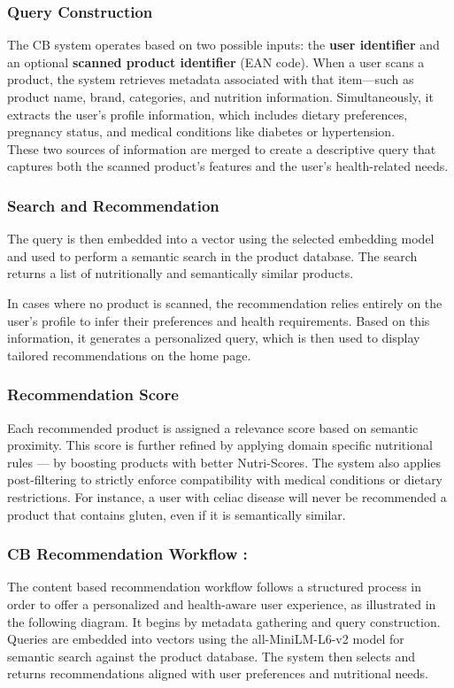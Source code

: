 \subsubsection{Query Construction}
\par The CB system operates based on two possible inputs: the \textbf{user identifier} and an optional \textbf{scanned product identifier} (EAN code). When a user scans a product, the system retrieves metadata associated with that item—such as product name, brand, categories, and nutrition information. Simultaneously, it extracts the user’s profile information, which includes dietary preferences, pregnancy status, and medical conditions like diabetes or hypertension.\\
These two sources of information are merged to create a descriptive query that captures both the scanned product’s features and the user's health-related needs. 

\subsubsection{Search and Recommendation}
The query is then embedded into a vector using the selected embedding model and used to perform a semantic search in the product database. The search returns a list of nutritionally and semantically similar products.
\par In cases where no product is scanned, the recommendation relies entirely on the user’s profile to infer their preferences and health requirements. Based on this information, it generates a personalized query, which is then used to display tailored recommendations on the home page.


\subsubsection{Recommendation Score}
\par Each recommended product is assigned a relevance score based on semantic proximity. This score is further refined by applying domain specific nutritional rules — by boosting products with better Nutri-Scores. The system also applies post-filtering to strictly enforce compatibility with medical conditions or dietary restrictions. For instance, a user with celiac disease will never be recommended a product that contains gluten, even if it is semantically similar.

\subsubsection{CB Recommendation Workflow :}
The content based recommendation workflow follows a structured process in order to offer a personalized and health-aware user experience, as illustrated in the following diagram. It begins by metadata gathering and query construction. Queries are embedded into vectors using the all-MiniLM-L6-v2 model for semantic search against the product database. The system then selects and returns recommendations aligned with user preferences and nutritional needs.

